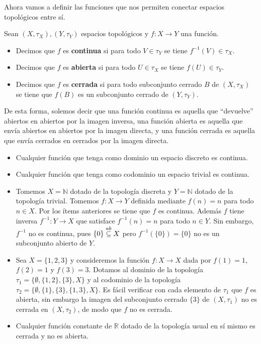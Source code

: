 Ahora vamos a definir las funciones que nos permiten conectar espacios topológicos entre sí.
\begin{Def}
   Sean $(X,\tau_X), (Y,\tau_Y)$ espacios topológicos y $f:X\to Y$ una función.
   \begin{itemize}
      \item[1.] Decimos que $f$ es \textbf{continua} si para todo $V\in\tau_Y$ se tiene $f^{-1}(V)\in \tau_X$.
      \item[2.] Decimos que $f$ es \textbf{abierta} si para todo $U\in \tau_X$ se tiene $f(U)\in \tau_Y$.
      \item[3.] Decimos que $f$ es \textbf{cerrada} si para todo subconjunto cerrado $B$ de $(X,\tau_X)$ se tiene que $f(B)$ es un subconjunto cerrado de $(Y,\tau_Y)$.
   \end{itemize}
\end{Def}
De esta forma, solemos decir que una función continua es aquella que ``devuelve'' abiertos en abiertos por la imagen inversa, una función abierta es aquella que envía abiertos en abiertos por la imagen directa, y una función cerrada es aquella que envía cerrados en cerrados por la imagen directa.
\begin{Ejm}\label{Ejm:funciones_continuas}
   \phantom{o}
   \begin{itemize}
      \item Cualquier función que tenga como dominio un espacio discreto es continua.
      \item Cualquier función que tenga como codominio un espacio trivial es continua.
      \item Tomemos $X=\mathbb{N}$ dotado de la topología discreta y $Y=\mathbb{N}$ dotado de la topología trivial. Tomemos $f:X\to Y$ definida mediante $f(n)=n$ para todo $n\in X$. Por los ítems anteriores se tiene que $f$ es continua. Además $f$ tiene inversa $f^{-1}:Y\to X$ que satisface $f^{-1}(n)=n$ para todo $n\in Y$. Sin embargo, $f^{-1}$ no es continua, pues $\{0\}\stackrel{ab}{\subseteq} X$ pero $f^{-1}(\{0\})=\{0\}$ no es un subconjunto abierto de $Y$.   
      \item Sea $X = \{1, 2, 3\}$ y consideremos la función $f: X \to X$ dada por $f(1) = 1$, $f(2) = 1$ y $f(3) = 3$. Dotamos al dominio de la topología $\tau_1 = \{\emptyset, \{1, 2\}, \{3\}, X\}$ y al codominio de la topología $\tau_2 = \{\emptyset, \{1\}, \{3\}, \{1, 3\}, X\}$. Es fácil verificar con cada elemento de $\tau_1$ que $f$ es abierta, sin embargo la imagen del subconjunto cerrado $\{3\}$ de $(X,\tau_1)$ no es cerrada en $(X,\tau_2)$, de modo que $f$ no es cerrada.
      \item Cualquier función constante de $\mathbb{R}$ dotado de la topología usual en sí mismo es cerrada y no es abierta.
   \end{itemize}
\end{Ejm}
